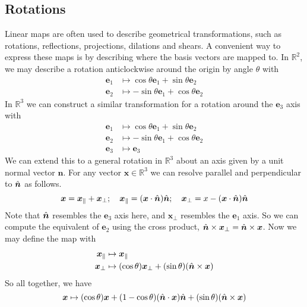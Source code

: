 \documentclass{article}
\begin{document}
	\subsection{Rotations}
	Linear maps are often used to describe geometrical transformations, such as rotations, reflections, projections, dilations and shears. A convenient way to express these maps is by describing where the basis vectors are mapped to. In $\mathbb R^2$, we may describe a rotation anticlockwise around the origin by angle $\theta$ with
	\begin{align*}
		\bm e_1 &\mapsto \cos \theta \bm e_1 + \sin \theta \bm e_2 \\
		\bm e_2 &\mapsto -\sin \theta \bm e_1 + \cos \theta \bm e_2
	\end{align*}
	In $\mathbb R^3$ we can construct a similar transformation for a rotation around the $\bm e_3$ axis with
	\begin{align*}
		\bm e_1 &\mapsto \cos \theta \bm e_1 + \sin \theta \bm e_2 \\
		\bm e_2 &\mapsto -\sin \theta \bm e_1 + \cos \theta \bm e_2 \\
		\bm e_3 &\mapsto \bm e_3
	\end{align*}
	We can extend this to a general rotation in $\mathbb R^3$ about an axis given by a unit normal vector $\hat {\bm n}$. For any vector $\bm x \in \mathbb R^3$ we can resolve parallel and perpendicular to $\hat{\bm n}$ as follows.
	\[ \bm x = \bm x_\parallel + \bm x_\perp;\quad \bm x_\parallel = (\bm x \cdot \hat{\bm n}) \hat{\bm n};\quad \bm x_\perp = x - (\bm x \cdot \hat{\bm n}) \hat{\bm n} \]
	Note that $\hat{\bm n}$ resembles the $\bm e_3$ axis here, and $\bm x_\perp$ resembles the $\bm e_1$ axis. So we can compute the equivalent of $\bm e_2$ using the cross product, $\hat{\bm n} \times \bm x_\perp = \hat{\bm n} \times \bm x$. Now we may define the map with
	\begin{align*}
		\bm x_\parallel &\mapsto \bm x_\parallel \\
		\bm x_\perp &\mapsto (\cos \theta) \bm x_\perp + (\sin \theta)(\hat{\bm n} \times \bm x)
	\end{align*}
	So all together, we have
	\[ \bm x \mapsto (\cos \theta) \bm x + (1 - \cos \theta) (\hat{\bm n} \cdot \bm x)\hat{\bm n} + (\sin \theta)(\hat{\bm n} \times \bm x) \]
\end{document}
